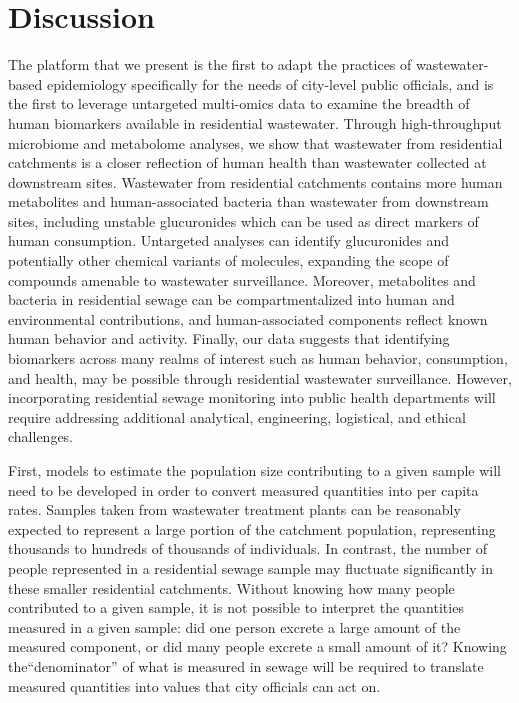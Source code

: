 \section{Discussion}

The platform that we present is the first to adapt the practices of wastewater-based epidemiology specifically for the needs of city-level public officials, and is the first to leverage untargeted multi-omics data to examine the breadth of human biomarkers available in residential wastewater. Through high-throughput microbiome and metabolome analyses, we show that wastewater from residential catchments is a closer reflection of human health than wastewater collected at downstream sites. Wastewater from residential catchments contains more human metabolites and human-associated bacteria than wastewater from downstream sites, including unstable glucuronides which can be used as direct markers of human consumption. Untargeted analyses can identify glucuronides and potentially other chemical variants of molecules, expanding the scope of compounds amenable to wastewater surveillance. Moreover, metabolites and bacteria in residential sewage can be compartmentalized into human and environmental contributions, and human-associated components reflect known human behavior and activity. Finally, our data suggests that identifying biomarkers across many realms of interest such as human behavior, consumption, and health, may be possible through residential wastewater surveillance. However, incorporating residential sewage monitoring into public health departments will require addressing additional analytical, engineering, logistical, and ethical challenges.

First, models to estimate the population size contributing to a given sample will need to be developed in order to convert measured quantities into per capita rates. Samples taken from wastewater treatment plants can be reasonably expected to represent a large portion of the catchment population, representing thousands to hundreds of thousands of individuals. In contrast, the number of people represented in a residential sewage sample may fluctuate significantly in these smaller residential catchments. Without knowing how many people contributed to a given sample, it is not possible to interpret the quantities measured in a given sample: did one person excrete a large amount of the measured component, or did many people excrete a small amount of it? Knowing the``denominator'' of what is measured in sewage will be required to translate measured quantities into values that city officials can act on.

